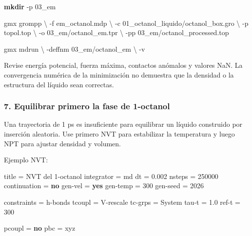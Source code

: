 \documentclass[
  spanish,
  11pt,
  a4paper]{article}
\newenvironment{Shaded}{\begin{snugshade}}{\end{snugshade}}
\newcommand{\AttributeTok}[1]{\textcolor[rgb]{0.13,0.29,0.53}{#1}}
\newcommand{\DataTypeTok}[1]{\textcolor[rgb]{0.13,0.29,0.53}{#1}}
\newcommand{\DecValTok}[1]{\textcolor[rgb]{0.00,0.00,0.81}{#1}}
\newcommand{\ExtensionTok}[1]{#1}
\newcommand{\FloatTok}[1]{\textcolor[rgb]{0.00,0.00,0.81}{#1}}
\newcommand{\FunctionTok}[1]{\textcolor[rgb]{0.13,0.29,0.53}{\textbf{#1}}}
\newcommand{\KeywordTok}[1]{\textcolor[rgb]{0.13,0.29,0.53}{\textbf{#1}}}
\newcommand{\NormalTok}[1]{#1}
\newcommand{\OtherTok}[1]{\textcolor[rgb]{0.56,0.35,0.01}{#1}}
\newcommand{\StringTok}[1]{\textcolor[rgb]{0.31,0.60,0.02}{#1}}
\begin{document}
\begin{Shaded}
\begin{Highlighting}[]
\FunctionTok{mkdir} \AttributeTok{{-}p}\NormalTok{ 03\_em}

\ExtensionTok{gmx}\NormalTok{ grompp }\DataTypeTok{\textbackslash{}}
    \AttributeTok{{-}f}\NormalTok{ em\_octanol.mdp }\DataTypeTok{\textbackslash{}}
    \AttributeTok{{-}c}\NormalTok{ 01\_octanol\_liquido/octanol\_box.gro }\DataTypeTok{\textbackslash{}}
    \AttributeTok{{-}p}\NormalTok{ topol.top }\DataTypeTok{\textbackslash{}}
    \AttributeTok{{-}o}\NormalTok{ 03\_em/octanol\_em.tpr }\DataTypeTok{\textbackslash{}}
    \AttributeTok{{-}pp}\NormalTok{ 03\_em/octanol\_processed.top}

\ExtensionTok{gmx}\NormalTok{ mdrun }\DataTypeTok{\textbackslash{}}
    \AttributeTok{{-}deffnm}\NormalTok{ 03\_em/octanol\_em }\DataTypeTok{\textbackslash{}}
    \AttributeTok{{-}v}
\end{Highlighting}
\end{Shaded}

Revise energía potencial, fuerza máxima, contactos anómalos y valores
NaN. La convergencia numérica de la minimización no demuestra que la
densidad o la estructura del líquido sean correctas.

\subsubsection{7. Equilibrar primero la fase de
1-octanol}\label{equilibrar-primero-la-fase-de-1-octanol}

Una trayectoria de 1 ps es insuficiente para equilibrar un líquido
construido por inserción aleatoria. Use primero NVT para estabilizar la
temperatura y luego NPT para ajustar densidad y volumen.

Ejemplo NVT:

\begin{Shaded}
\begin{Highlighting}[]
\DataTypeTok{title           }\OtherTok{=}\StringTok{ NVT del 1{-}octanol}
\DataTypeTok{integrator      }\OtherTok{=}\StringTok{ md}
\DataTypeTok{dt              }\OtherTok{=}\StringTok{ }\FloatTok{0.002}
\DataTypeTok{nsteps          }\OtherTok{=}\StringTok{ }\DecValTok{250000}
\DataTypeTok{continuation    }\OtherTok{=}\StringTok{ }\KeywordTok{no}
\DataTypeTok{gen{-}vel         }\OtherTok{=}\StringTok{ }\KeywordTok{yes}
\DataTypeTok{gen{-}temp        }\OtherTok{=}\StringTok{ }\DecValTok{300}
\DataTypeTok{gen{-}seed        }\OtherTok{=}\StringTok{ }\DecValTok{2026}

\DataTypeTok{constraints     }\OtherTok{=}\StringTok{ h{-}bonds}
\DataTypeTok{tcoupl          }\OtherTok{=}\StringTok{ V{-}rescale}
\DataTypeTok{tc{-}grps         }\OtherTok{=}\StringTok{ System}
\DataTypeTok{tau{-}t           }\OtherTok{=}\StringTok{ }\FloatTok{1.0}
\DataTypeTok{ref{-}t           }\OtherTok{=}\StringTok{ }\DecValTok{300}

\DataTypeTok{pcoupl          }\OtherTok{=}\StringTok{ }\KeywordTok{no}
\DataTypeTok{pbc             }\OtherTok{=}\StringTok{ xyz}
\end{Highlighting}
\end{Shaded}
\end{document}
